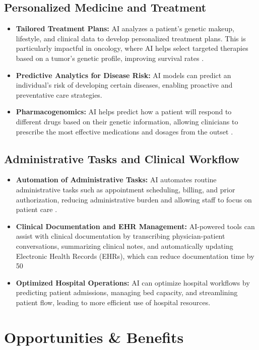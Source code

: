 \subsection{Personalized Medicine and Treatment}
\begin{itemize}
    \item \textbf{Tailored Treatment Plans:} AI analyzes a patient's genetic makeup, lifestyle, and clinical data to develop personalized treatment plans. This is particularly impactful in oncology, where AI helps select targeted therapies based on a tumor's genetic profile, improving survival rates \cite{NRINA_PersonalizedMedicine}.
    \item \textbf{Predictive Analytics for Disease Risk:} AI models can predict an individual's risk of developing certain diseases, enabling proactive and preventative care strategies.
    \item \textbf{Pharmacogenomics:} AI helps predict how a patient will respond to different drugs based on their genetic information, allowing clinicians to prescribe the most effective medications and dosages from the outset \cite{NIH_PersonalizedMedicine}.
\end{itemize}

\subsection{Administrative Tasks and Clinical Workflow}
\begin{itemize}
    \item \textbf{Automation of Administrative Tasks:} AI automates routine administrative tasks such as appointment scheduling, billing, and prior authorization, reducing administrative burden and allowing staff to focus on patient care \cite{Keragon_AdminTasks}.
    \item \textbf{Clinical Documentation and EHR Management:} AI-powered tools can assist with clinical documentation by transcribing physician-patient conversations, summarizing clinical notes, and automatically updating Electronic Health Records (EHRs), which can reduce documentation time by 50%
    \item \textbf{Optimized Hospital Operations:} AI can optimize hospital workflows by predicting patient admissions, managing bed capacity, and streamlining patient flow, leading to more efficient use of hospital resources.
\end{itemize}

\section{Opportunities \& Benefits}

